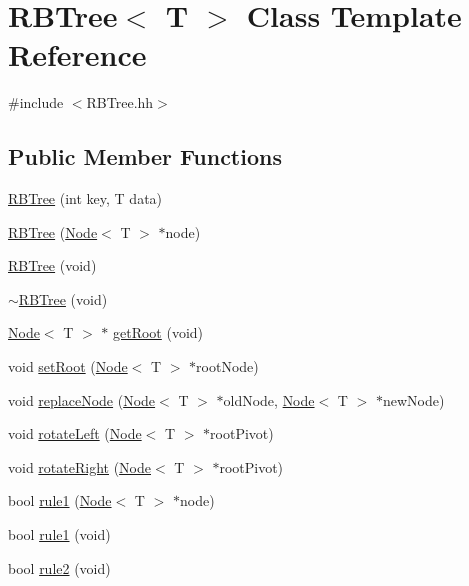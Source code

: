 \hypertarget{class_r_b_tree}{}\section{R\+B\+Tree$<$ T $>$ Class Template Reference}
\label{class_r_b_tree}


{\ttfamily \#include $<$R\+B\+Tree.\+hh$>$}

\subsection*{Public Member Functions}
\begin{DoxyCompactItemize}
\item 
\hyperlink{class_r_b_tree_a743575c444246d79b343bf7f8090eb9f}{R\+B\+Tree} (int key, T data)
\item 
\hyperlink{class_r_b_tree_afd8831000cdef5cd6215e17d0684f6f1}{R\+B\+Tree} (\hyperlink{class_node}{Node}$<$ T $>$ $\ast$node)
\item 
\hyperlink{class_r_b_tree_a00a0aeb1b39260cb068efaa65797d6bc}{R\+B\+Tree} (void)
\item 
\hyperlink{class_r_b_tree_ac79abd8464ef7926dfd071f30c189e0e}{$\sim$\+R\+B\+Tree} (void)
\item 
\hyperlink{class_node}{Node}$<$ T $>$ $\ast$ \hyperlink{class_r_b_tree_a64c300beb5a2e7bd312a3204d49d2d79}{get\+Root} (void)
\item 
void \hyperlink{class_r_b_tree_ab95534142bf0d1960d68dc56403794f3}{set\+Root} (\hyperlink{class_node}{Node}$<$ T $>$ $\ast$root\+Node)
\item 
void \hyperlink{class_r_b_tree_a9fab96c10f78263a054cacc9d9b4b997}{replace\+Node} (\hyperlink{class_node}{Node}$<$ T $>$ $\ast$old\+Node, \hyperlink{class_node}{Node}$<$ T $>$ $\ast$new\+Node)
\item 
void \hyperlink{class_r_b_tree_a9c273ccbb0be52e1342335df9d27c3fd}{rotate\+Left} (\hyperlink{class_node}{Node}$<$ T $>$ $\ast$root\+Pivot)
\item 
void \hyperlink{class_r_b_tree_a92bd8bf1b99ff9837b2888182c3819ce}{rotate\+Right} (\hyperlink{class_node}{Node}$<$ T $>$ $\ast$root\+Pivot)
\item 
bool \hyperlink{class_r_b_tree_a2c1f95cd704de8c87f60dd02d54c3b04}{rule1} (\hyperlink{class_node}{Node}$<$ T $>$ $\ast$node)
\item 
bool \hyperlink{class_r_b_tree_ac5ef6ef34686c9e1036c35d3bf56f8cf}{rule1} (void)
\item 
bool \hyperlink{class_r_b_tree_a922765a4307e414802cb20bf9f405f7e}{rule2} (void)

\end{DoxyCompactItemize}
